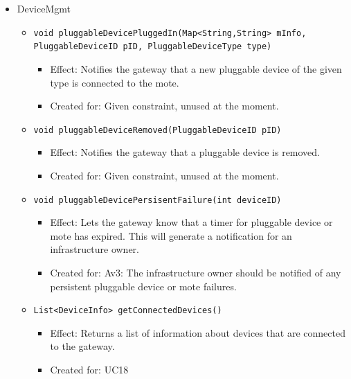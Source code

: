 \begin{itemize}
            \item DeviceMgmt
            \begin{itemize}
                \item \texttt{void pluggableDevicePluggedIn(Map<String,String> mInfo,
                                                            PluggableDeviceID pID,
                                                            PluggableDeviceType type)}
                    \begin{itemize}
                        \item Effect: Notifies the gateway that a new pluggable device
                              of the given type is connected to the mote.
                        \item Created for: Given constraint, unused at the moment.
                    \end{itemize}
                \item \texttt{void pluggableDeviceRemoved(PluggableDeviceID pID)}
                    \begin{itemize}
                        \item Effect: Notifies the gateway that a pluggable device is removed.
                        \item Created for: Given constraint, unused at the moment.
                    \end{itemize}
                \item \texttt{void pluggableDevicePersisentFailure(int deviceID)}
                    \begin{itemize}
                        \item Effect: Lets the gateway know that a timer for pluggable device or mote has expired.
                              This will generate a notification for an infrastructure owner.
                        \item Created for: Av3: The infrastructure owner should be notified of
                              any persistent pluggable device or mote failures.
                    \end{itemize}
                \item \texttt{List<DeviceInfo> getConnectedDevices()}
                    \begin{itemize}
                        \item Effect: Returns a list of information about devices that are connected to the gateway.
                        \item Created for: UC18

\end{itemize}
\end{itemize}
\end{itemize}
